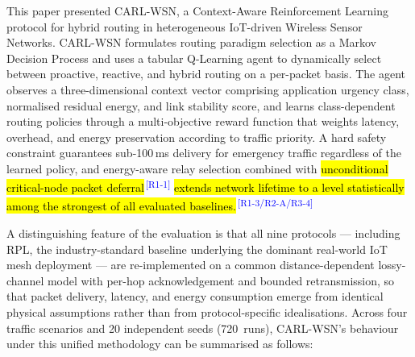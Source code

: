 \documentclass[12pt]{article}
\newcommand{\rtag}[1]{\textsuperscript{\textcolor{blue}{\scriptsize\,[#1]}}}
\newcommand{\hlx}[1]{{\exhyphenpenalty=10000\hyphenpenalty=10000\let\ \nobreakspace\hl{#1}}}
\begin{document}
This paper presented CARL-WSN, a Context-Aware Reinforcement Learning
protocol for hybrid routing in heterogeneous IoT-driven Wireless
Sensor Networks. CARL-WSN formulates routing paradigm selection as a
Markov Decision Process and uses a tabular Q-Learning agent to
dynamically select between proactive, reactive, and hybrid routing on
a per-packet basis. The agent observes a three-dimensional context
vector comprising application urgency class, normalised residual
energy, and link stability score, and learns class-dependent routing
policies through a multi-objective reward function that weights
latency, overhead, and energy preservation according to traffic
priority. A hard safety constraint guarantees sub-100\,ms delivery for
emergency traffic regardless of the learned policy, and
energy-aware relay selection combined with \hlx{unconditional
critical-node packet deferral}\rtag{R1-1} \hlx{extends network lifetime to a level
statistically among the strongest of all evaluated baselines.}\rtag{R1-3/R2-A/R3-4}

A distinguishing feature of the evaluation is that all nine
protocols --- including RPL, the industry-standard baseline
underlying the dominant real-world IoT mesh deployment --- are
re-implemented on a common distance-dependent lossy-channel model
with per-hop acknowledgement and bounded retransmission, so that
packet delivery, latency, and energy consumption emerge from
identical physical assumptions rather than from protocol-specific
idealisations. Across four traffic scenarios and 20 independent
seeds (720~runs), CARL-WSN's behaviour under this unified
methodology can be summarised as follows:
\end{document}
